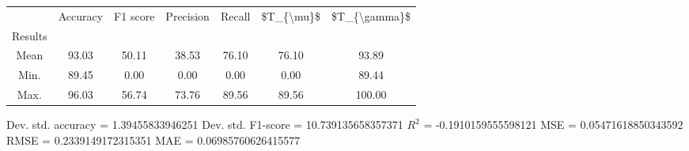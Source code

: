 \begin{tabular}{|c|c|c|c|c|c|c|}
\toprule
{} &  Accuracy &  F1 score &  Precision &  Recall &  \$T\_\{\textbackslash mu\}\$ &  \$T\_\{\textbackslash gamma\}\$ \\
Results &           &           &            &         &            &               \\
\hline
Mean    &     93.03 &     50.11 &      38.53 &   76.10 &      76.10 &         93.89 \\
Min.    &     89.45 &      0.00 &       0.00 &    0.00 &       0.00 &         89.44 \\
Max.    &     96.03 &     56.74 &      73.76 &   89.56 &      89.56 &        100.00 \\
\bottomrule
\end{tabular}

 Dev. std. accuracy = 1.39455833946251
 Dev. std. F1-score = 10.739135658357371
 $R^2$ = -0.1910159555598121
 MSE = 0.05471618850343592
 RMSE = 0.2339149172315351
 MAE = 0.06985760626415577